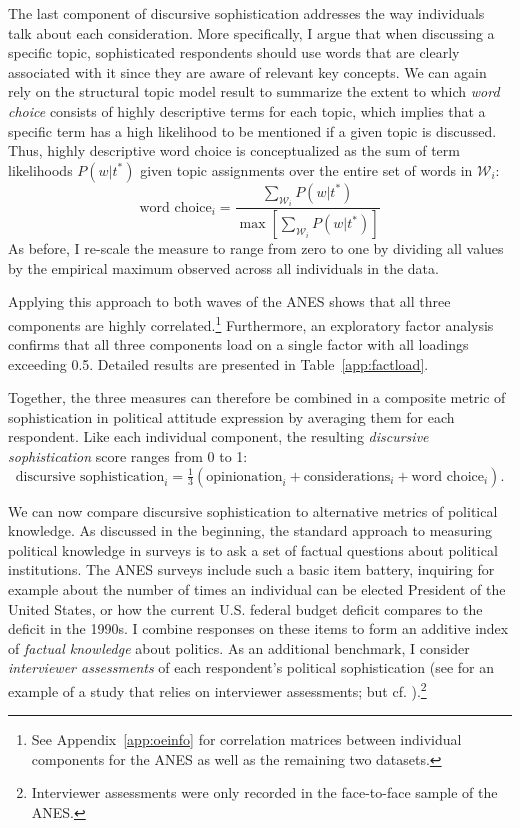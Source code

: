 The last component of discursive sophistication addresses the way individuals talk about each consideration. More specifically, I argue that when discussing a specific topic, sophisticated respondents should use words that are clearly associated with it since they are aware of relevant key concepts. We can again rely on the structural topic model result to summarize the extent to which \textit{word choice} consists of highly descriptive terms for each topic, which implies that a specific term has a high likelihood to be mentioned if a given topic is discussed. Thus, highly descriptive word choice is conceptualized as the sum of term likelihoods $P(w|t^*)$ given topic assignments over the entire set of words in $\mathcal{W}_i$:
\begin{equation}
\text{word choice}_i = \dfrac{\sum_{\mathcal{W}_i} P(w|t^*)}{\max\left[\sum_{\mathcal{W}_i} P(w|t^*)\right]}
\end{equation}
As before, I re-scale the measure to range from zero to one by dividing all values by the empirical maximum observed across all individuals in the data.

Applying this approach to both waves of the ANES shows that all three components are highly correlated.\footnote{See Appendix~\ref{app:oeinfo} for correlation matrices between individual components for the ANES as well as the remaining two datasets.} Furthermore, an exploratory factor analysis confirms that all three components load on a single factor with all loadings exceeding 0.5. Detailed results are presented in Table~\ref{app:factload}.



Together, the three measures can therefore be combined in a composite metric of sophistication in political attitude expression by averaging them for each respondent. Like each individual component, the resulting \textit{discursive sophistication} score ranges from 0 to 1:
\begin{equation}
\text{discursive sophistication}_i = \tfrac{1}{3}(\text{opinionation}_i + \text{considerations}_i + \text{word choice}_i).
\end{equation}

We can now compare discursive sophistication to alternative metrics of political knowledge. As discussed in the beginning, the standard approach to measuring political knowledge in surveys is to ask a set of factual questions about political institutions. The ANES surveys include such a basic item battery, inquiring for example about the number of times an individual can be elected President of the United States, or how the current U.S. federal budget deficit compares to the deficit in the 1990s. I combine responses on these items to form an additive index of \textit{factual knowledge} about politics. As an additional benchmark, I consider \textit{interviewer assessments} of each respondent's political sophistication (see \citealt{bartels2005homer} for an example of a study that relies on interviewer assessments; but cf. \citealt{ryan2011accuracy}).\footnote{Interviewer assessments were only recorded in the face-to-face sample of the ANES.}

